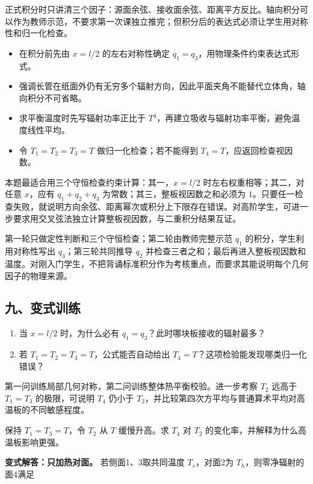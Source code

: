 \documentclass[12pt,a4paper,UTF8]{ctexart}
\newcommand{\tightlist}{\setlength{\itemsep}{0pt}\setlength{\parskip}{0pt}}
\begin{document}
正式积分时只讲清三个因子：源面余弦、接收面余弦、距离平方反比。轴向积分可以作为教师示范，不要求第一次课独立推完；但积分后的表达式必须让学生用对称性和归一化检查。

\begin{itemize}
\tightlist
\item
  在积分前先由 \(x=l/2\) 的左右对称性确定
  \(q_1=q_3\)，用物理条件约束表达式形式。
\item
  强调长管在纸面外仍有无穷多个辐射方向，因此平面夹角不能替代立体角，轴向积分不可省略。
\item
  求平衡温度时先写辐射功率正比于
  \(T^4\)，再建立吸收与辐射功率平衡，避免温度线性平均。
\item
  令 \(T_1=T_2=T_3=T\) 做归一化检查；若不能得到
  \(T_4=T\)，应返回检查视因数。
\end{itemize}

本题最适合用三个守恒检查约束计算：其一，\(x=l/2\)
时左右权重相等；其二，对任意 \(x\)，应有 \(q_1+q_2+q_3\)
为常数；其三，整板视因数之和必须为
\(1\)。只要任一检查失败，就说明方向余弦、距离幂次或积分上下限存在错误。对高阶学生，可进一步要求用交叉弦法独立计算整板视因数，与二重积分结果互证。

第一轮只做定性判断和三个守恒检查；第二轮由教师完整示范 \(q_1\)
的积分，学生利用对称性写出 \(q_3\)；第三轮共同推导 \(q_2\)
并检查三者之和；最后再进入整板视因数和温度。对刚入门学生，不把背诵标准积分作为考核重点，而要求其能说明每个几何因子的物理来源。

\subsection{九、变式训练}\label{ux4e5dux53d8ux5f0fux8badux7ec3-5}

\begin{enumerate}
\def\labelenumi{\arabic{enumi}.}
\tightlist
\item
  当 \(x=l/2\) 时，为什么必有 \(q_1=q_3\)？此时哪块板接收的辐射最多？
\item
  若 \(T_1=T_2=T_3=T\)，公式能否自动给出
  \(T_4=T\)？这项检验能发现哪类归一化错误？
\end{enumerate}

第一问训练局部几何对称，第二问训练整体热平衡校验。进一步考察 \(T_2\)
远高于 \(T_1=T_3\) 的极限，可说明 \(T_4\) 仍小于
\(T_2\)，并比较第四次方平均与普通算术平均对高温板的不同敏感程度。

保持 \(T_1=T_3=T\)，令 \(T_2\) 从 \(T\) 缓慢升高。求 \(T_4\) 对 \(T_2\)
的变化率，并解释为什么高温板影响更强。

\textbf{变式解答：只加热对面。} 若侧面1、3取共同温度 \(T_s\)，对面2为
\(T_h\)，则零净辐射的面4满足
\end{document}
